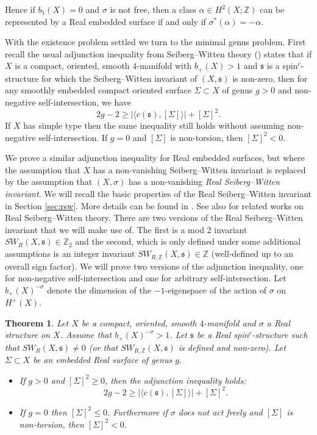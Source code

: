 \documentclass{amsart}
\newtheorem{theorem}{Theorem}[section]
\theoremstyle{definition}
\theoremstyle{remark}
\numberwithin{equation}{section}
\begin{document}
Hence if $b_1(X)=0$ and $\sigma$ is not free, then a class $\alpha \in H^2(X ; \mathbb{Z})$ can be represented by a Real embedded surface if and only if $\sigma^*(\alpha) = -\alpha$.

With the existence problem settled we turn to the minimal genus problem. First recall the usual adjunction inequality from Seiberg--Witten theory (\cite{km,law,os}) states that if $X$ is a compact, oriented, smooth $4$-manifold with $b_+(X) > 1$ and $\mathfrak{s}$ is a spin$^c$-structure for which the Seiberg--Witten invariant of $(X,\mathfrak{s})$ is non-zero, then for any smoothly embedded compact oriented surface $\Sigma \subset X$ of genus $g>0$ and non-negative self-intersection, we have
\[
2g - 2 \ge | \langle c(\mathfrak{s}) , [\Sigma] \rangle | + [\Sigma]^2.
\]
If $X$ has simple type then the same inequality still holds without assuming non-negative self-intersection. If $g=0$ and $[\Sigma]$ is non-torsion, then $[\Sigma]^2 < 0$.

We prove a similar adjunction inequality for Real embedded surfaces, but where the assumption that $X$ has a non-vanishing Seiberg--Witten invariant is replaced by the assumption that $(X,\sigma)$ has a non-vanishing {\em Real Seiberg--Witten invariant}. We will recall the basic properties of the Real Seiberg--Witten invariant in Section \ref{sec:rsw}. More details can be found in \cite{tw, bar3}. See also \cite{nak1,nak,kato,li,mi,kmt,bh,mpt} for related works on Real Seiberg--Witten theory. There are two versions of the Real Seiberg--Witten invariant that we will make use of. The first is a mod $2$ invariant $SW_R(X,\mathfrak{s}) \in \mathbb{Z}_2$ and the second, which is only defined under some additional assumptions is an integer invariant $SW_{R,\mathbb{Z}}(X,\mathfrak{s}) \in \mathbb{Z}$ (well-defined up to an overall sign factor). We will prove two versions of the adjunction inequality, one for non-negative self-intersection and one for arbitrary self-intersection. Let $b_+(X)^{-\sigma}$ denote the dimension of the $-1$-eigenspace of the action of $\sigma$ on $H^+(X)$.

\begin{theorem}
Let $X$ be a compact, oriented, smooth $4$-manifold and $\sigma$ a Real structure on $X$. Assume that $b_+(X)^{-\sigma} > 1$. Let $\mathfrak{s}$ be a Real spin$^c$-structure such that $SW_R(X , \mathfrak{s}) \neq 0$ (or that $SW_{R,\mathbb{Z}}(X , \mathfrak{s})$ is defined and non-zero). Let $\Sigma \subset X$ be an embedded Real surface of genus $g$.
\begin{itemize}
\item[(1)]{If $g>0$ and $[\Sigma]^2 \ge 0$, then the adjunction inequality holds:
\[
2g-2 \ge | \langle c(\mathfrak{s}) , [\Sigma] \rangle | + [\Sigma]^2.
\]
}
\item[(2)]{If $g=0$ then $[\Sigma]^2 \le 0$. Furthermore if $\sigma$ does not act freely and $[\Sigma]$ is non-torsion, then $[\Sigma]^2 < 0$.}
\end{itemize}

\end{theorem}
\end{document}

